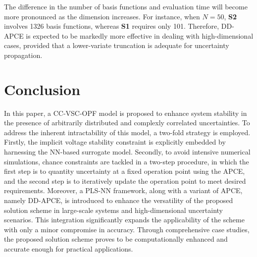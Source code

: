 \documentclass[journal]{IEEEtran}
\theoremstyle{definition}
\theoremstyle{remark}
\begin{document}
The difference in the number of basis functions and evaluation time will become more pronounced as the dimension increases. For instance, when $N=50$, \textbf{S2} involves 1326 basis functions, whereas \textbf{S1} requires only 101.
Therefore, DD-APCE is expected to be markedly more effective in dealing with high-dimensional cases, provided that a lower-variate truncation is adequate for uncertainty propagation.
\section{Conclusion}\label{conclusion}
In this paper, a CC-VSC-OPF model is proposed to enhance system stability in the presence of arbitrarily distributed and complexly correlated uncertainties. To address the inherent intractability of this model, a two-fold strategy is employed. Firstly, the implicit voltage stability constraint is explicitly embedded by harnessing the NN-based surrogate model. Secondly, to avoid intensive numerical simulations, chance constraints are tackled in a two-step procedure, in which the first step is to quantity uncertainty at a fixed operation point using the APCE, and the second step is to iteratively update the operation point to meet desired requirements. Moreover, a PLS-NN framework, along with a variant of APCE, namely DD-APCE, is introduced to enhance the versatility of the proposed solution scheme in large-scale systems and high-dimensional uncertainty scenarios. This integration significantly expands the applicability of the scheme with only a minor compromise in accuracy. Through comprehensive case studies, the proposed solution scheme proves to be computationally enhanced and accurate enough for practical applications.

\ifCLASSOPTIONcaptionsoff
  \newpage
\fi






\end{document}
